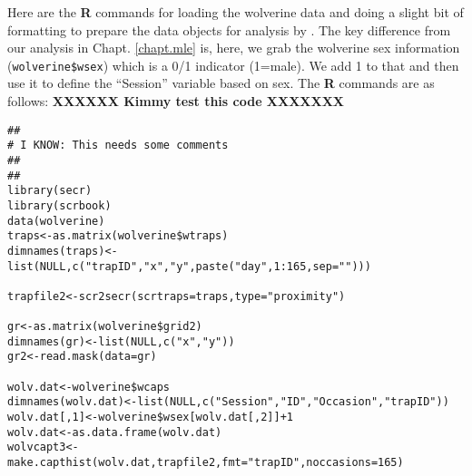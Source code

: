 Here are the {\bf R} commands for loading the wolverine data and doing
a slight bit of formatting to prepare the data objects for analysis by
\mbox{\secr}. The key difference from our analysis in
Chapt. \ref{chapt.mle} is, here, we grab the wolverine sex information
(\mbox{\tt wolverine\$wsex}) which is a 0/1 indicator (1=male). We add
1 to that and then use it to define the ``Session'' variable based on sex.
The {\bf R} commands are as follows:  {\bf XXXXXX Kimmy test this code XXXXXXX}
{\small
\begin{verbatim}
##
# I KNOW: This needs some comments
##
##
library(secr)
library(scrbook)
data(wolverine)
traps<-as.matrix(wolverine$wtraps)
dimnames(traps)<-list(NULL,c("trapID","x","y",paste("day",1:165,sep="")))

trapfile2<-scr2secr(scrtraps=traps,type="proximity")

gr<-as.matrix(wolverine$grid2)
dimnames(gr)<-list(NULL,c("x","y"))
gr2<-read.mask(data=gr)

wolv.dat<-wolverine$wcaps
dimnames(wolv.dat)<-list(NULL,c("Session","ID","Occasion","trapID"))
wolv.dat[,1]<-wolverine$wsex[wolv.dat[,2]]+1
wolv.dat<-as.data.frame(wolv.dat)
wolvcapt3<-make.capthist(wolv.dat,trapfile2,fmt="trapID",noccasions=165)
\end{verbatim}
}

